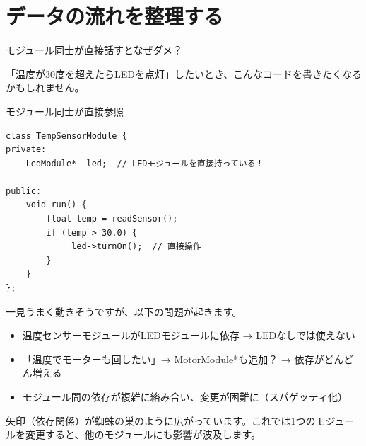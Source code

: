 \section{データの流れを整理する}

\begin{qabox}{モジュール同士が直接話すとなぜダメ？}

「温度が30度を超えたらLEDを点灯」したいとき、こんなコードを書きたくなるかもしれません。

\begin{badexample}{モジュール同士が直接参照}
\begin{lstlisting}
class TempSensorModule {
private:
    LedModule* _led;  // LEDモジュールを直接持っている！

public:
    void run() {
        float temp = readSensor();
        if (temp > 30.0) {
            _led->turnOn();  // 直接操作
        }
    }
};
\end{lstlisting}
\end{badexample}

一見うまく動きそうですが、以下の問題が起きます。

\begin{itemize}
  \item 温度センサーモジュールがLEDモジュールに依存 → LEDなしでは使えない
  \item 「温度でモーターも回したい」→ MotorModule*も追加？ → 依存がどんどん増える
  \item モジュール間の依存が複雑に絡み合い、変更が困難に（スパゲッティ化）
\end{itemize}

\begin{center}
\end{center}

矢印（依存関係）が蜘蛛の巣のように広がっています。これでは1つのモジュールを変更すると、他のモジュールにも影響が波及します。

\end{qabox}

